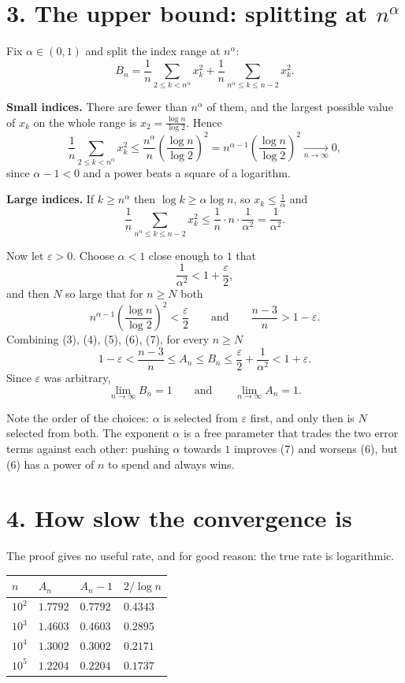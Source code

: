 \documentclass[12pt]{article}
\newcommand{\An}{A_n}
\newcommand{\Bn}{B_n}
\begin{document}
\section*{3. The upper bound: splitting at \(n^{\alpha}\)}

Fix \(\alpha\in(0,1)\) and split the index range at \(n^{\alpha}\):
\[
\Bn=\frac1n\sum_{2\le k<n^{\alpha}}x_k^2+\frac1n\sum_{n^{\alpha}\le k\le n-2}x_k^2 .
\tag{5}
\]

\textbf{Small indices.} There are fewer than \(n^{\alpha}\) of them, and
the largest possible value of \(x_k\) on the whole range is
\(x_2=\frac{\log n}{\log2}\). Hence
\[
\frac1n\sum_{2\le k<n^{\alpha}}x_k^2
\le\frac{n^{\alpha}}{n}\left(\frac{\log n}{\log2}\right)^2
=n^{\alpha-1}\left(\frac{\log n}{\log2}\right)^2
\xrightarrow[n\to\infty]{}0,
\tag{6}
\]
since \(\alpha-1<0\) and a power beats a square of a logarithm.

\textbf{Large indices.} If \(k\ge n^{\alpha}\) then
\(\log k\ge\alpha\log n\), so \(x_k\le\frac1\alpha\) and
\[
\frac1n\sum_{n^{\alpha}\le k\le n-2}x_k^2
\le\frac1n\cdot n\cdot\frac1{\alpha^2}
=\frac1{\alpha^2}.
\tag{7}
\]

Now let \(\varepsilon>0\). Choose \(\alpha<1\) close enough to \(1\) that
\[
\frac1{\alpha^2}<1+\frac\varepsilon2 ,
\]
and then \(N\) so large that for \(n\ge N\) both
\[
n^{\alpha-1}\left(\frac{\log n}{\log2}\right)^2<\frac\varepsilon2
\qquad\text{and}\qquad
\frac{n-3}{n}>1-\varepsilon .
\]
Combining (3), (4), (5), (6), (7), for every \(n\ge N\)
\[
1-\varepsilon<\frac{n-3}{n}\le\An\le\Bn
\le\frac\varepsilon2+\frac1{\alpha^2}<1+\varepsilon .
\]
Since \(\varepsilon\) was arbitrary,
\[
\boxed{\displaystyle
\lim_{n\to\infty}\Bn=1
\qquad\text{and}\qquad
\lim_{n\to\infty}\An=1 .}
\]

Note the order of the choices: \(\alpha\) is selected from
\(\varepsilon\) first, and only then is \(N\) selected from both. The
exponent \(\alpha\) is a free parameter that trades the two error terms
against each other: pushing \(\alpha\) towards \(1\) improves (7) and
worsens (6), but (6) has a power of \(n\) to spend and always wins.

\section*{4. How slow the convergence is}

The proof gives no useful rate, and for good reason: the true rate is
logarithmic.

\begin{center}
\small
\renewcommand{\arraystretch}{1.35}
\begin{tabularx}{0.9\textwidth}{@{}lXXX@{}}
\toprule
\(n\) & \(\An\) & \(\An-1\) & \(2/\log n\) \\
\midrule
\(10^2\) & \(1.7792\) & \(0.7792\) & \(0.4343\) \\
\(10^3\) & \(1.4603\) & \(0.4603\) & \(0.2895\) \\
\(10^4\) & \(1.3002\) & \(0.3002\) & \(0.2171\) \\
\(10^5\) & \(1.2204\) & \(0.2204\) & \(0.1737\) \\
\bottomrule
\end{tabularx}
\end{center}
\end{document}
